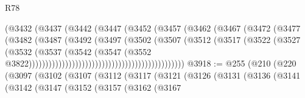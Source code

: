 \begin{lexlean}{R78}
\begin{coremodule}
                                                (@3432
                                                  (@3437
                                                    (@3442
                                                      (@3447
                                                        (@3452
                                                          (@3457
                                                            (@3462
                                                              (@3467
                                                                (@3472
                                                                  (@3477
                                                                    (@3482
                                                                      (@3487
                                                                        (@3492
                                                                          (@3497
                                                                            (@3502
                                                                              (@3507
                                                                                (@3512
                                                                                  (@3517
                                                                                    (@3522
                                                                                      (@3527
                                                                                        (@3532
                                                                                          (@3537
                                                                                            (@3542
                                                                                              (@3547
                                                                                                (@3552
                                                                                                  @3822)))))))))))))))))))))))))))))))))))))))))))))))
@3918 := @255
    (@210
      (@220
        (@3097
          (@3102
            (@3107
              (@3112
                (@3117
                  (@3121
                    (@3126
                      (@3131
                        (@3136
                          (@3141
                            (@3142
                              (@3147
                                (@3152
                                  (@3157
                                    (@3162
                                      (@3167

\end{coremodule}
\end{lexlean}
